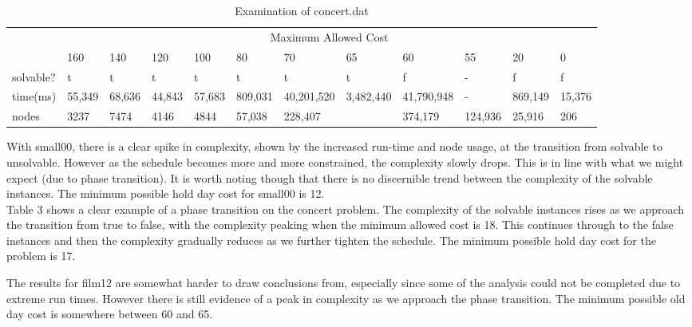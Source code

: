 \documentclass{article}
\begin{document}
\begin{table}[h]\footnotesize
\centering
\label{concertTable}
\begin{tabularx}{\textwidth}{|X|X|X|X|X|X|X|X|X|X|X|X|}
\hline
 & \multicolumn{11}{c|}{Maximum Allowed Cost} \\ \cline{ 2 - 12}
 & 160 & 140 & 120 & 100 & 80 & 70 & 65 & 60 & 55 & 20 & 0\\
\hline
solvable?  & t & t & t & t & t & t & t & f & - & f & f  \\
\hline
time(ms)  & 55,349 & 68,636 & 44,843 & 57,683 & 809,031 & 40,201,520 & 3,482,440 & 41,790,948 & - & 869,149 & 15,376 \\
\hline
nodes & 3237 & 7474 & 4146 & 4844 & 57,038 & 228,407 &  & 374,179 & 124,936 & 25,916 & 206 \\
\hline
\end{tabularx}
\caption{Examination of concert.dat}
\end{table}

With small00, there is a clear spike in complexity, shown by the increased run-time and node usage, at the transition from solvable to unsolvable. However as the schedule becomes more and more constrained, the complexity slowly drops. This is in line with what we might expect (due to phase transition). It is worth noting though that there is no discernible trend between the complexity of the solvable instances. The minimum possible hold day cost for small00 is 12.\\

Table 3 shows a clear example of a phase transition on the concert problem. The complexity of the solvable instances rises as we approach the transition from true to false, with the complexity peaking when the minimum allowed cost is 18. This continues through to the false instances and then the complexity gradually reduces as we further tighten the schedule. The minimum possible hold day cost for the problem is 17.

The results for film12 are somewhat harder to draw conclusions from, especially since some of the analysis could not be completed due to extreme run times. However there is still evidence of a peak in complexity as we approach the phase transition. The minimum possible old day cost is somewhere between 60 and 65.
\end{document}
